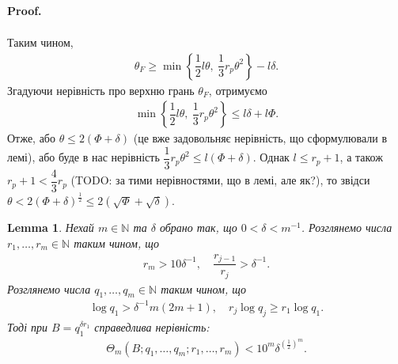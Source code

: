\documentclass[a4paper, 10pt]{article}
\makeatletter
\theoremstyle{theoremdd}
\theoremstyle{theoremdd}
\theoremstyle{theoremdd}
\theoremstyle{theoremdd}
\theoremstyle{theoremdd}
\theoremstyle{theoremdd}
\theoremstyle{theoremdd}
\theoremstyle{theoremdd}
\theoremstyle{theoremdd}
\theoremstyle{theoremdd}
\theoremstyle{theoremdd}
\theoremstyle{theoremdd}
\theoremstyle{theoremdd}
\newtheorem{lemma}[theorem]{Lemma}
\theoremstyle{theoremdd}
\theoremstyle{theoremdd}
\renewenvironment{proof}[1][Proof.\\]{\par
\pushQED{\hfill \qed}%
\normalfont \topsep6\p@\@plus6\p@\relax
\trivlist
\item\relax
{\bfseries
#1\@addpunct{.}}\hspace\labelsep\ignorespaces
}{%
\popQED\endtrivlist\@endpefalse
}
\makeatother
\begin{document}
\begin{proof}
\begin{align*}
\end{align*}
Таким чином,
\begin{align*}
\theta_F \geq \min \left\{ \dfrac{1}{2}l \theta,\ \dfrac{1}{3} r_p \theta^2 \right\} - l \delta.
\end{align*}
Згадуючи нерівність про верхню грань $\theta_F$, отримуємо
\begin{align*}
\min \left\{ \dfrac{1}{2}l \theta,\ \dfrac{1}{3}r_p \theta^2 \right\} \leq l \delta + l \Phi.
\end{align*}
Отже, або $\theta \leq 2(\Phi + \delta)$ (це вже задовольняє нерівність, що сформулювали в лемі), або буде в нас нерівність $\dfrac{1}{3}r_p \theta^2 \leq l (\Phi + \delta)$. Однак $l \leq r_p+1$, а також $r_{p} + 1 < \dfrac{4}{3}r_p$ (TODO: за тими нерівностями, що в лемі, але як?), то звідси $\theta < 2(\Phi+\delta)^{\frac{1}{2}} \leq 2 (\sqrt{\Phi} + \sqrt{\delta})$.
\end{proof}

\begin{lemma}
Нехай $m \in \mathbb{N}$ та $\delta$ обрано так, що $0 < \delta < m^{-1}$. Розглянемо числа $r_1,\dots,r_m \in \mathbb{N}$ таким чином, що
\begin{align*}
r_m > 10\delta^{-1},\quad \dfrac{r_{j-1}}{r_j} > \delta^{-1}.
\end{align*}
Розглянемо числа $q_1,\dots,q_m \in \mathbb{N}$ таким чином, що
\begin{align*}
\log q_1 > \delta^{-1} m (2m+1), \quad r_j \log q_j \geq r_1 \log q_1.
\end{align*}
Тоді при $B = q_1^{\delta r_1}$ справедлива нерівність:
\begin{align*}
\Theta_m(B;q_1,\dots,q_m;r_1,\dots,r_m) < 10^m \delta^{\left(\frac{1}{2}\right)^m}.
\end{align*}
\end{lemma}
\end{document}

